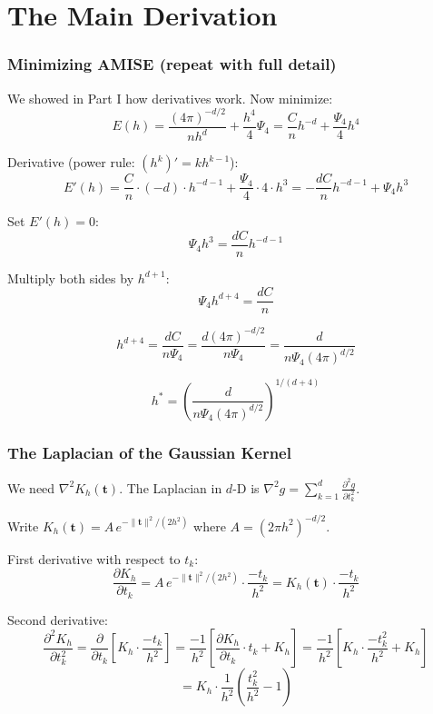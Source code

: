 \documentclass[12pt]{article}
\begin{document}
\part{The Main Derivation}

\section{Minimizing AMISE (repeat with full detail)}

We showed in Part I how derivatives work. Now minimize:
$$E(h) = \frac{(4\pi)^{-d/2}}{nh^d} + \frac{h^4}{4}\Psi_4 = \frac{C}{n}h^{-d} + \frac{\Psi_4}{4}h^4$$

Derivative (power rule: $(h^k)' = kh^{k-1}$):
$$E'(h) = \frac{C}{n}\cdot(-d)\cdot h^{-d-1} + \frac{\Psi_4}{4}\cdot 4\cdot h^3 = -\frac{dC}{n}h^{-d-1} + \Psi_4 h^3$$

Set $E'(h) = 0$:
$$\Psi_4 h^3 = \frac{dC}{n}h^{-d-1}$$

Multiply both sides by $h^{d+1}$:
$$\Psi_4 h^{d+4} = \frac{dC}{n}$$

$$h^{d+4} = \frac{dC}{n\Psi_4} = \frac{d(4\pi)^{-d/2}}{n\Psi_4} = \frac{d}{n\Psi_4(4\pi)^{d/2}}$$

$$h^* = \left(\frac{d}{n\Psi_4(4\pi)^{d/2}}\right)^{1/(d+4)}$$

\section{The Laplacian of the Gaussian Kernel}

We need $\nabla^2 K_h(\mathbf{t})$. The Laplacian in $d$-D is $\nabla^2 g = \sum_{k=1}^d \frac{\partial^2 g}{\partial t_k^2}$.

Write $K_h(\mathbf{t}) = A\,e^{-\|\mathbf{t}\|^2/(2h^2)}$ where $A = (2\pi h^2)^{-d/2}$.

First derivative with respect to $t_k$:
$$\frac{\partial K_h}{\partial t_k} = A\,e^{-\|\mathbf{t}\|^2/(2h^2)}\cdot\frac{-t_k}{h^2} = K_h(\mathbf{t})\cdot\frac{-t_k}{h^2}$$

Second derivative:
$$\frac{\partial^2 K_h}{\partial t_k^2} = \frac{\partial}{\partial t_k}\left[K_h\cdot\frac{-t_k}{h^2}\right] = \frac{-1}{h^2}\left[\frac{\partial K_h}{\partial t_k}\cdot t_k + K_h\right] = \frac{-1}{h^2}\left[K_h\cdot\frac{-t_k^2}{h^2} + K_h\right]$$
$$= K_h\cdot\frac{1}{h^2}\left(\frac{t_k^2}{h^2} - 1\right)$$
\end{document}
